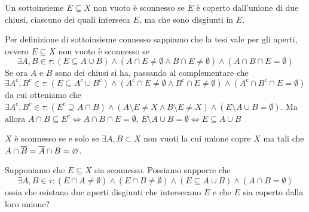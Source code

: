 \begin{es}
  Un sottoinsieme $ E \subseteq X $ non vuoto è sconnesso se $ E $ è coperto dall'unione di due chiusi, ciascuno dei quali interseca $ E $, ma che sono disgiunti in $ E $.
\end{es}
%
Per definizione di sottoinsieme connesso sappiamo che la tesi vale per gli aperti, ovvero $ E \subseteq X $ non vuoto è sconnesso se \[\exists A, B \in \tau : (E \subseteq A \cup B) \wedge (A \cap E \neq \emptyset \wedge B \cap E \neq \emptyset) \wedge (A \cap B \cap E = \emptyset)\] Se ora $ A $ e $ B $ sono dei chiusi si ha, passando al complementare che $ \exists A^c, B^c \in \tau : (E \subseteq A^c \cup B^c) \wedge (A^c \cap E \neq \emptyset \wedge B^c \cap E \neq \emptyset) \wedge (A^c \cap B^c \cap E = \emptyset) $ da cui otteniamo che $ \exists A^c, B^c \in \tau : (E^c \supseteq A \cap B) \wedge (A \setminus E \neq X \wedge B \setminus E \neq X) \wedge (E \setminus A \cup B = \emptyset) $. Ma allora $ A \cap B \subseteq E^c \iff A \cap B \cap E = \emptyset $, $ E \setminus A \cup B = \emptyset \iff E \subseteq A \cup B $

\begin{es}
  $ X $ è sconnesso se e solo se $ \exists A, B \subset X $ non vuoti la cui unione copre $ X $ ma tali che $ A \cap \overline{B} = \overline{A} \cap B = \varnothing $.
\end{es}
%

\begin{es}
  Supponiamo che $ E \subseteq X $ sia sconnesso. Possiamo supporre che \[\exists A, B \in \tau : (E \cap A \neq \emptyset) \wedge (E \cap B \neq \emptyset) \wedge (E \subseteq A \cup B) \wedge (A \cap B = \emptyset)\] ossia che esistano due aperti disgiunti che intersecano $ E $ e che $ E $ sia coperto dalla loro unione?
\end{es}
%

